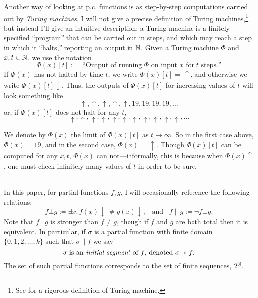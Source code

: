 \documentclass{amsart}
\begin{document}
	Another way of looking at p.c. functions is as step-by-step computations carried out by \textit{Turing machines}. I will not give a precise definition of Turing machines,\footnote{See \cite{soare} for a rigorous definition of Turing machine.} but instead I'll give an intuitive description: a Turing machine is a finitely-specified ``program'' that can be carried out in steps, and which may reach a step in which it ``halts,'' reporting an output in $\mathbb{N}$. Given a Turing machine $\Phi$ and $x,t\in \mathbb{N}$, we use the notation
	$$
	\Phi(x)[t] := \text{ ``Output of running $\Phi$ on input $x$ for $t$ steps.''}
	$$
	If $\Phi(x)$ has not halted by time $t$, we write $\Phi(x)[t]=\,\uparrow$, and otherwise we write $\Phi(x)[t]\downarrow$. Thus, the outputs of $\Phi(x)[t]$ for increasing values of $t$ will look something like
	$$
	\uparrow,\uparrow,\uparrow,\uparrow,\uparrow,19,19,19,19,\dots
	$$
	or, if $\Phi(x)[t]$ does not halt for any $t$, 
	$$
	\uparrow,\uparrow,\uparrow,\uparrow,\uparrow,\uparrow,\uparrow,\uparrow,\uparrow,\uparrow,\uparrow,\dots
	$$
	\begin{samepage}We denote by $\Phi(x)$ the limit of $\Phi(x)[t]$ as $t\to\infty$. So in the first case above, $\Phi(x)=19$, and in the second case, $\Phi(x)=\,\uparrow$. Though $\Phi(x)[t]$ can be computed for any $x,t$, $\Phi(x)$ can not---informally, this is because when $\Phi(x)\uparrow$, one must check infinitely many values of $t$ in order to be sure.\end{samepage}\\
	
	In this paper, for partial functions $f,g$, I will occasionally reference the following relations:
	$$f\bot g := \exists x: f(x)\downarrow \, \neq g(x)\downarrow, \;\;\; \text{and} \;\;\; f\parallel g := \neg f\bot g.$$ 
	Note that $f \bot g$ is stronger than $f\neq g$, though if $f$ and $g$ are both total then it is equivalent. In particular, if $\sigma$ is a partial function with finite domain $\{0,1,2,\dots,k\}$ such that $\sigma \parallel f$ we say 
	$$
	\sigma \text{ is an \textit{initial segment} of $f$, denoted $\sigma \prec f$.}
	$$
	The set of such partial functions corresponds to the set of finite sequences, $2^{\mathbb{N}}$.\\
	
\end{document}
